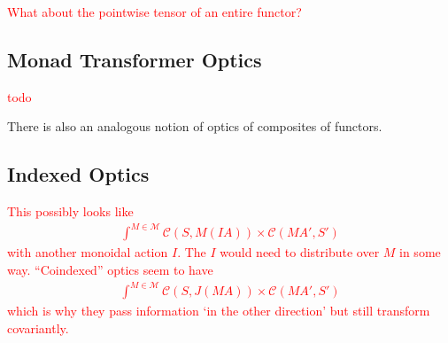 \documentclass[11pt,a4paper]{article}
\theoremstyle{plain}
\theoremstyle{definition}
\newcommand{\C}{\mathscr{C}}
\newcommand{\M}{\mathscr{M}}
\newcommand{\todo}[1]{\textcolor{red}{\small #1}}
\begin{document}
\todo{What about the pointwise tensor of an entire functor?}

\subsection{Monad Transformer Optics}

\todo{todo}

There is also an analogous notion of optics of composites of functors.

\subsection{Indexed Optics}
\todo{
  This possibly looks like
  \begin{align*}
    \int^{M \in \M} \C(S, M(IA)) \times \C(M A', S')
  \end{align*}
  with another monoidal action $I$. The $I$ would need to distribute over $M$ in some way. ``Coindexed'' optics seem to have
  \begin{align*}
    \int^{M \in \M} \C(S, J(MA)) \times \C(M A', S')
  \end{align*}
  which is why they pass information `in the other direction' but still transform covariantly.
}
\end{document}

